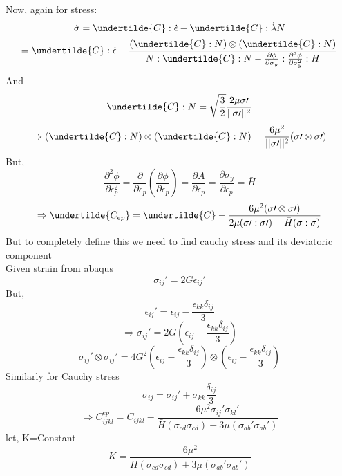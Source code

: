\documentclass{article}
\begin{document}
Now, again for stress:
\begin{equation}
    \dot{\sigma}=\undertilde{C}:\dot{\epsilon}- \undertilde{C}:\dot{\lambda}N
\end{equation}
\begin{equation}
    = \undertilde{C}:\dot{\epsilon}- \frac{(\undertilde{C}:N)\otimes (\undertilde{C}:N)}{N:\undertilde{C}:N -\frac{\partial \phi}{\partial \sigma_{y}} :\frac{\partial^{2} \phi}{\partial \sigma_{y}^{2}}:H}
\end{equation}
And
\begin{equation}
    \undertilde{C}:N= \sqrt{\frac{3}{2}} \frac{2\mu \sigma\prime}{||\sigma\prime||^{2}}
\end{equation}
\begin{equation}
    \Rightarrow (\undertilde{C}:N)\otimes(\undertilde{C}:N)=\frac{6\mu^{2}}{||\sigma\prime||^{2}}(\sigma\prime\otimes\sigma\prime)
\end{equation}
But,
\begin{equation}
    \frac{\partial^{2} \phi}{\partial \epsilon_{p}^{2}} =\frac{\partial}{\partial \epsilon_{p}}(\frac{\partial \phi}{\partial \epsilon_{p}}) = \frac{\partial A}{\partial \epsilon_{p}}= \frac{\partial \sigma_{y}}{\partial \epsilon_{p}} = \bar{H}
\end{equation}
\begin{equation}
    \Rightarrow \undertilde{C_{ep}} =\undertilde{C}- \frac{6\mu^{2} (\sigma\prime\otimes\sigma\prime)}{2\mu(\sigma\prime:\sigma\prime) +\bar{H}(\sigma:\sigma)}
\end{equation}
But to completely define this we need to find cauchy stress and its deviatoric component\\
Given strain from abaqus
\begin{equation}
    \sigma_{ij}\prime= 2G\epsilon_{ij}\prime
\end{equation}
But,
\begin{equation}
    \epsilon_{ij}\prime= \epsilon_{ij} - \frac{\epsilon_{kk}\delta_{ij}}{3}
\end{equation}
\begin{equation}
    \Rightarrow \sigma_{ij}\prime = 2G(\epsilon_{ij} - \frac{\epsilon_{kk}\delta_{ij}}{3})
\end{equation}
\begin{equation}
    \sigma_{ij}\prime\otimes\sigma_{ij}\prime= 4G^{2}(\epsilon_{ij} - \frac{\epsilon_{kk}\delta_{ij}}{3})\otimes(\epsilon_{ij} - \frac{\epsilon_{kk}\delta_{ij}}{3})
\end{equation}
Similarly for Cauchy stress
\begin{equation}
    \sigma_{ij}=\sigma_{ij}\prime + \sigma_{kk}\frac{\delta_{ij}}{3}
\end{equation}
\begin{equation}
    \Rightarrow C_{ijkl}^{ep}= C_{ijkl} - \frac{6\mu^{2} \sigma_{ij}\prime\sigma_{kl}\prime}{\bar{H}(\sigma_{cd}\sigma_{cd}) +3\mu(\sigma_{ab}\prime\sigma_{ab}\prime)}
\end{equation}
let, K=Constant
\begin{equation}
    K=\frac{6\mu^{2}}{\bar{H}(\sigma_{cd}\sigma_{cd}) +3\mu(\sigma_{ab} \prime\sigma_{ab}\prime)}
\end{equation}
\end{document}
